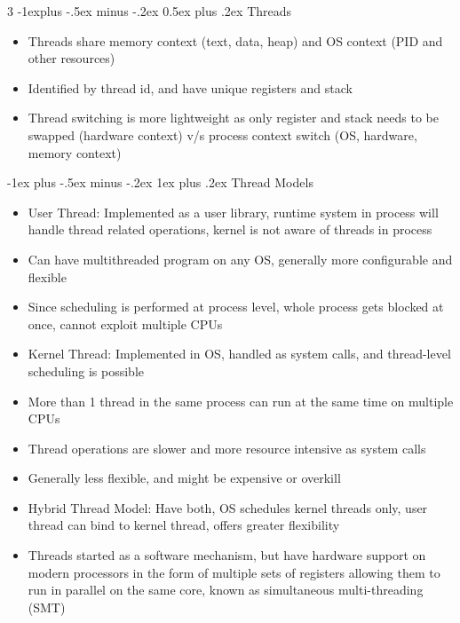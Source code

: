 \documentclass[10pt, landscape]{article}
\makeatletter
\renewcommand{\section}{\@startsection{section}{1}{0mm}%
                                {-1ex plus -.5ex minus -.2ex}%
                                {0.5ex plus .2ex}%
                                {\normalfont\large\bfseries}}
\renewcommand{\section}{\@startsection{section}{2}{0mm}%
                                {-1explus -.5ex minus -.2ex}%
                                {0.5ex plus .2ex}%
                                {\normalfont\normalsize\bfseries}}
\renewcommand{\subsection}{\@startsection{subsection}{3}{0mm}%
                                {-1ex plus -.5ex minus -.2ex}%
                                {1ex plus .2ex}%
                                {\normalfont\small\bfseries}}%
\makeatother
\begin{document}
\begin{multicols*}{3}
\section{Threads}
\begin{itemize}
    \item Threads share memory context (text, data, heap) and OS context (PID and other resources)
    \item Identified by thread id, and have unique registers and stack
    \item Thread switching is more lightweight as only register and stack needs to be swapped (hardware context) v/s process context switch (OS, hardware, memory context)
\end{itemize}

\subsection{Thread Models}
\begin{itemize}
    \item User Thread: Implemented as a user library, runtime system in process will handle thread related operations, kernel is not aware of threads in process
    \item Can have multithreaded program on any OS, generally more configurable and flexible
    \item Since scheduling is performed at process level, whole process gets blocked at once, cannot exploit multiple CPUs
    \item Kernel Thread: Implemented in OS, handled as system calls, and thread-level scheduling is possible
    \item More than 1 thread in the same process can run at the same time on multiple CPUs
    \item Thread operations are slower and more resource intensive as system calls
    \item Generally less flexible, and might be expensive or overkill
    \item Hybrid Thread Model: Have both, OS schedules kernel threads only, user thread can bind to kernel thread, offers greater flexibility
    \item Threads started as a software mechanism, but have hardware support on modern processors in the form of multiple sets of registers allowing them to run in parallel on the same core, known as simultaneous multi-threading (SMT)
\end{itemize}


\end{multicols*}
\end{document}
